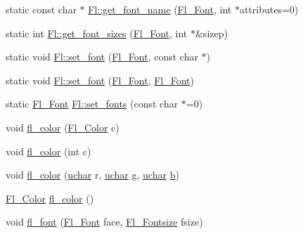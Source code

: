 \begin{DoxyCompactItemize}
\item 
static const char $\ast$ \hyperlink{group__fl__attributes_ga464d8439250b0636ddc9375fc660b29f}{Fl\+::get\+\_\+font\+\_\+name} (\hyperlink{_enumerations_8_h_a2ac46d9f082834b969fffe490a03a709}{Fl\+\_\+\+Font}, int $\ast$attributes=0)
\item 
static int \hyperlink{group__fl__attributes_ga3751aad3db88d47d05eea1b1c90b2c47}{Fl\+::get\+\_\+font\+\_\+sizes} (\hyperlink{_enumerations_8_h_a2ac46d9f082834b969fffe490a03a709}{Fl\+\_\+\+Font}, int $\ast$\&sizep)
\item 
static void \hyperlink{group__fl__attributes_gac8bc23064aae455f7e5649240cf66b6d}{Fl\+::set\+\_\+font} (\hyperlink{_enumerations_8_h_a2ac46d9f082834b969fffe490a03a709}{Fl\+\_\+\+Font}, const char $\ast$)
\item 
static void \hyperlink{group__fl__attributes_ga229f381b4ccf634ad83bd5ad4b428ea1}{Fl\+::set\+\_\+font} (\hyperlink{_enumerations_8_h_a2ac46d9f082834b969fffe490a03a709}{Fl\+\_\+\+Font}, \hyperlink{_enumerations_8_h_a2ac46d9f082834b969fffe490a03a709}{Fl\+\_\+\+Font})
\item 
static \hyperlink{_enumerations_8_h_a2ac46d9f082834b969fffe490a03a709}{Fl\+\_\+\+Font} \hyperlink{group__fl__attributes_gaacc901040c27daf45117a3691d0ab03a}{Fl\+::set\+\_\+fonts} (const char $\ast$=0)
\item 
void \hyperlink{group__fl__attributes_ga974e9f64959aa83cf6f0a36d3f0105aa}{fl\+\_\+color} (\hyperlink{_enumerations_8_h_a8b762953646f8abee866061f1af78a6a}{Fl\+\_\+\+Color} c)
\item 
void \hyperlink{group__fl__attributes_ga40be3354c55ced3fb119e063cd832716}{fl\+\_\+color} (int c)
\item 
void \hyperlink{group__fl__attributes_ga208595f1c4e4bd0c32ee5a56194b405c}{fl\+\_\+color} (\hyperlink{fl__types_8h_a65f85814a8290f9797005d3b28e7e5fc}{uchar} r, \hyperlink{fl__types_8h_a65f85814a8290f9797005d3b28e7e5fc}{uchar} g, \hyperlink{fl__types_8h_a65f85814a8290f9797005d3b28e7e5fc}{uchar} \hyperlink{forms_8_h_a0ba06a290a384fa06b1b90745827dae2}{b})
\item 
\hyperlink{_enumerations_8_h_a8b762953646f8abee866061f1af78a6a}{Fl\+\_\+\+Color} \hyperlink{group__fl__attributes_gaea8392e995de663b0d8063af199cf085}{fl\+\_\+color} ()
\item 
void \hyperlink{group__fl__attributes_ga80203d2dd1e06550e7a35d6bb72f9bd6}{fl\+\_\+font} (\hyperlink{_enumerations_8_h_a2ac46d9f082834b969fffe490a03a709}{Fl\+\_\+\+Font} face, \hyperlink{_enumerations_8_h_ad58927f5c691454480f7cd28362502f1}{Fl\+\_\+\+Fontsize} fsize)

\end{DoxyCompactItemize}
